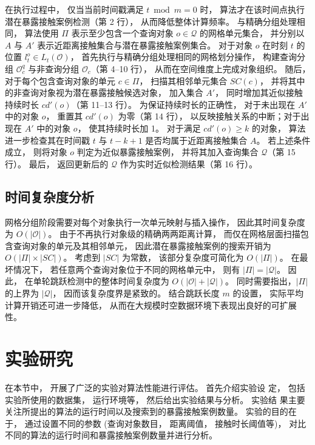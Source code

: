 在执行过程中， 仅当当前时间戳满足 $t \bmod m = 0$ 时， 算法才在该时间点执行潜在暴露接触案例检测（第 2 行）， 从而降低整体计算频率。 与精确分组处理相同， 算法使用 $\Pi$ 表示至少包含一个查询对象 $o \in \mathcal{Q}$ 的网格单元集合， 并分别以 $A$ 与 $A'$ 表示近距离接触集合与潜在暴露接触案例集合。 对于对象 $o$ 在时刻 $t$ 的位置 $l_t^o \in L_t(\mathcal{O})$， 首先执行与精确分组处理相同的网格划分操作， 构建查询分组 $\mathcal{O}_c^q$ 与非查询分组 $\mathcal{O}_c$（第 4--10 行）， 从而在空间维度上完成对象组织。 随后， 对于每个包含查询对象的单元 $c \in \Pi$， 扫描其相邻单元集合 $SC(c)$， 并将其中的非查询对象视为潜在暴露接触候选对象， 加入集合 $A'$， 同时增加其近似接触持续时长 $cd'(o)$（第 11--13 行）。 为保证持续时长的正确性， 对于未出现在 $A'$ 中的对象 $o$， 重置其 $cd'(o)$ 为零（第 14 行）， 以反映接触关系的中断；对于出现在 $A'$ 中的对象 $o$， 使其持续时长加 1。 对于满足 $cd'(o) \ge k$ 的对象， 算法进一步检查其在时间戳 $t$ 与 $t-k+1$ 是否均属于近距离接触集合 $A$。 若上述条件成立， 则将对象 $o$ 判定为近似暴露接触案例， 并将其加入查询集合 $\mathcal{Q}$（第 15 行）。 最后， 返回更新后的 $\mathcal{Q}$ 作为实时近似检测结果（第 16 行）。

\subsection{时间复杂度分析}

网格分组阶段需要对每个对象执行一次单元映射与插入操作， 因此其时间复杂度为 $O(|\mathcal{O}|)$。 由于不再执行对象级的精确两两距离计算， 而仅在网格层面扫描包含查询对象的单元及其相邻单元， 因此潜在暴露接触案例的搜索开销为 $O(|\Pi| \times |SC|)$。 考虑到 $|SC|$ 为常数， 该部分复杂度可简化为 $O(|\Pi|)$。 在最坏情况下， 若任意两个查询对象位于不同的网格单元中， 则有 $|\Pi| = |\mathcal{Q}|$。 因此， 在单轮跳跃检测中的整体时间复杂度为 $O(|\mathcal{O}| + |\mathcal{Q}|)$。 同时需要指出，$|\Pi|$ 的上界为 $|\mathcal{Q}|$， 因而该复杂度界是紧致的。 结合跳跃长度 $m$ 的设置， 实际平均计算开销还可进一步降低， 从而在大规模时空数据环境下表现出良好的可扩展性。



\section{实验研究}
在本节中， 开展了广泛的实验对算法性能进行评估。 首先介绍实验设
定， 包括实验所使用的数据集， 运行环境等， 然后给出实验结果与分析。 实验结
果主要关注所提出的算法的运行时间以及搜索到的暴露接触案例数量。 实验的目的在
于， 通过设置不同的参数 (查询对象数目， 距离阈值， 接触时长阈值等)， 对比不同的算法的运行时间和暴露接触案例数量并进行分析。
